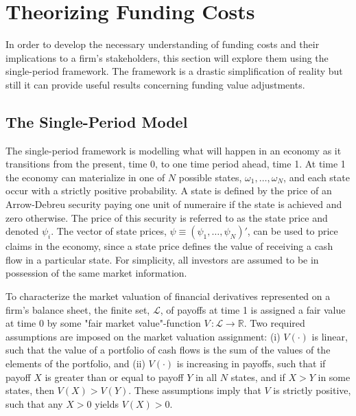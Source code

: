 \documentclass[main.tex]{subfiles}
\begin{document}
    \section{Theorizing Funding Costs}
    \label{sec:single-period-model}
        In order to develop the necessary understanding of funding costs and their implications to a firm's stakeholders, this section will explore them using the single-period framework.
        The framework is a drastic simplification of reality but still it can provide useful results concerning funding value adjustments.

    \subsection{The Single-Period Model}
        The single-period framework is modelling what will happen in an economy as it transitions from the present, time 0, to one time period ahead, time 1.
        At time 1 the economy can materialize in one of $N$ possible states, $\omega_{1}, \dots, \omega_{N}$, and each state occur with a strictly positive probability.
        A state is defined by the price of an Arrow-Debreu security paying one unit of numeraire if the state is achieved and zero otherwise.
        The price of this security is referred to as the state price and denoted $\psi_{i}$.
        The vector of state prices, $\psi \equiv \left(\psi_{1}, \dots, \psi_{N}\right)'$, can be used to price claims in the economy, since a state price defines the value of receiving a cash flow in a particular state.
        For simplicity, all investors are assumed to be in possession of the same market information.

        To characterize the market valuation of financial derivatives represented on a firm's balance sheet, the finite set, $\mathcal{L}$, of payoffs at time 1 is assigned a fair value at time 0 by some "fair market value"-function $V\, \colon \mathcal{L} \rightarrow \mathbb{R}$.
        Two required assumptions are imposed on the market valuation assignment: 
        (i) $V(\cdot)$ is linear, such that the value of a portfolio of cash flows is the sum of the values of the elements of the portfolio, and 
        (ii) $V(\cdot)$ is increasing in payoffs, such that if payoff $X$ is greater than or equal to payoff $Y$ in all $N$ states, and if $X>Y$ in some states, then $V(X)>V(Y)$.
        These assumptions imply that $V$ is strictly positive, such that any $X>0$ yields $V(X) > 0$.
        
\end{document}
